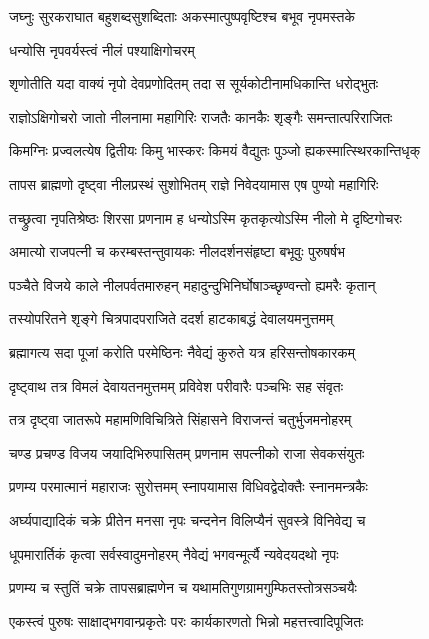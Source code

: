 \twolineshloka
{जघ्नुः सुरकराघात बहुशब्दसुशब्दिताः}
{अकस्मात्पुष्पवृष्टिश्च बभूव नृपमस्तके}%

\onelineshloka
{धन्योसि नृपवर्यस्त्वं नीलं पश्याक्षिगोचरम्}%

\twolineshloka
{शृणोतीति यदा वाक्यं नृपो देवप्रणोदितम्}
{तदा स सूर्यकोटीनामधिकान्ति धरोद्भुतः}%

\twolineshloka
{राज्ञोऽक्षिगोचरो जातो नीलनामा महागिरिः}
{राजतैः कानकैः शृङ्गैः समन्तात्परिराजितः}%

\twolineshloka
{किमग्निः प्रज्वलत्येष द्वितीयः किमु भास्करः}
{किमयं वैद्युतः पुञ्जो ह्यकस्मात्स्थिरकान्तिधृक्}%

\twolineshloka
{तापस ब्राह्मणो दृष्ट्वा नीलप्रस्थं सुशोभितम्}
{राज्ञे निवेदयामास एष पुण्यो महागिरिः}%

\twolineshloka
{तच्छ्रुत्वा नृपतिश्रेष्ठः शिरसा प्रणनाम ह}
{धन्योऽस्मि कृतकृत्योऽस्मि नीलो मे दृष्टिगोचरः}%

\twolineshloka
{अमात्यो राजपत्नी च करम्बस्तन्तुवायकः}
{नीलदर्शनसंहृष्टा बभूवुः पुरुषर्षभ}%

\twolineshloka
{पञ्चैते विजये काले नीलपर्वतमारुहन्}
{महादुन्दुभिनिर्घोषाञ्च्छृण्वन्तो ह्यमरैः कृतान्}%

\twolineshloka
{तस्योपरितने शृङ्गे चित्रपादपराजिते}
{ददर्श हाटकाबद्धं देवालयमनुत्तमम्}%

\twolineshloka
{ब्रह्मागत्य सदा पूजां करोति परमेष्ठिनः}
{नैवेद्यं कुरुते यत्र हरिसन्तोषकारकम्}%

\twolineshloka
{दृष्ट्वाथ तत्र विमलं देवायतनमुत्तमम्}
{प्रविवेश परीवारैः पञ्चभिः सह संवृतः}%

\twolineshloka
{तत्र दृष्ट्वा जातरूपे महामणिविचित्रिते}
{सिंहासने विराजन्तं चतुर्भुजमनोहरम्}%

\twolineshloka
{चण्ड प्रचण्ड विजय जयादिभिरुपासितम्}
{प्रणनाम सपत्नीको राजा सेवकसंयुतः}%

\twolineshloka
{प्रणम्य परमात्मानं महाराजः सुरोत्तमम्}
{स्नापयामास विधिवद्वेदोक्तैः स्नानमन्त्रकैः}%

\twolineshloka
{अर्घ्यपाद्यादिकं चक्रे प्रीतेन मनसा नृपः}
{चन्दनेन विलिप्यैनं सुवस्त्रे विनिवेद्य च}%

\twolineshloka
{धूपमारार्तिकं कृत्वा सर्वस्वादुमनोहरम्}
{नैवेद्यं भगवन्मूर्त्यै न्यवेदयदथो नृपः}%

\twolineshloka
{प्रणम्य च स्तुतिं चक्रे तापसब्राह्मणेन च}
{यथामतिगुणग्रामगुम्फितस्तोत्रसञ्चयैः}%


\twolineshloka
{एकस्त्वं पुरुषः साक्षाद्भगवान्प्रकृतेः परः}
{कार्यकारणतो भिन्नो महत्तत्त्वादिपूजितः}%

